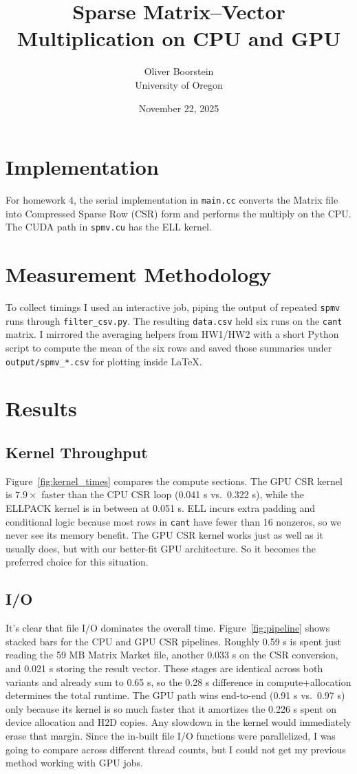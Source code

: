 \documentclass[11pt]{article}
\title{Sparse Matrix--Vector Multiplication on CPU and GPU}
\author{Oliver Boorstein \\ University of Oregon}
\date{November 22, 2025}
\begin{document}
\twocolumn[
  \maketitle
  \vspace{-1em}
]

\section{Implementation}
For homework 4, the serial implementation in \texttt{main.cc} converts the Matrix file into Compressed Sparse Row (CSR) form and performs the multiply on the CPU. The CUDA path in \texttt{spmv.cu} has the ELL kernel. 

\section{Measurement Methodology}
To collect timings I used an interactive job, piping the output of repeated \texttt{spmv} runs through \texttt{filter\_csv.py}. The resulting \texttt{data.csv} held six runs on the \texttt{cant} matrix. I mirrored the averaging helpers from HW1/HW2 with a short Python script to compute the mean of the six rows and saved those summaries under \texttt{output/spmv\_*.csv} for plotting inside LaTeX.

\section{Results}
\subsection{Kernel Throughput}
Figure~\ref{fig:kernel_times} compares the compute sections. The GPU CSR kernel is $7.9\times$ faster than the CPU CSR loop (0.041 s vs.\ 0.322 s), while the ELLPACK kernel is in between at 0.051 s. ELL incurs extra padding and conditional logic because most rows in \texttt{cant} have fewer than 16 nonzeros, so we never see its memory benefit. The GPU CSR kernel works just as well as it usually does, but with our better-fit GPU architecture. So it becomes the preferred choice for this situation.

\subsection{I/O}
It's clear that file I/O dominates the overall time. Figure~\ref{fig:pipeline} shows stacked bars for the CPU and GPU CSR pipelines. Roughly 0.59 s is spent just reading the 59 MB Matrix Market file, another 0.033 s on the CSR conversion, and 0.021 s storing the result vector. These stages are identical across both variants and already sum to 0.65 s, so the 0.28 s difference in compute+allocation determines the total runtime. The GPU path wins end-to-end (0.91 s vs.\ 0.97 s) only because its kernel is so much faster that it amortizes the 0.226 s spent on device allocation and H2D copies. Any slowdown in the kernel would immediately erase that margin. Since the in-built file I/O functions were parallelized, I was going to compare across different thread counts, but I could not get my previous method working with GPU jobs.
\end{document}
